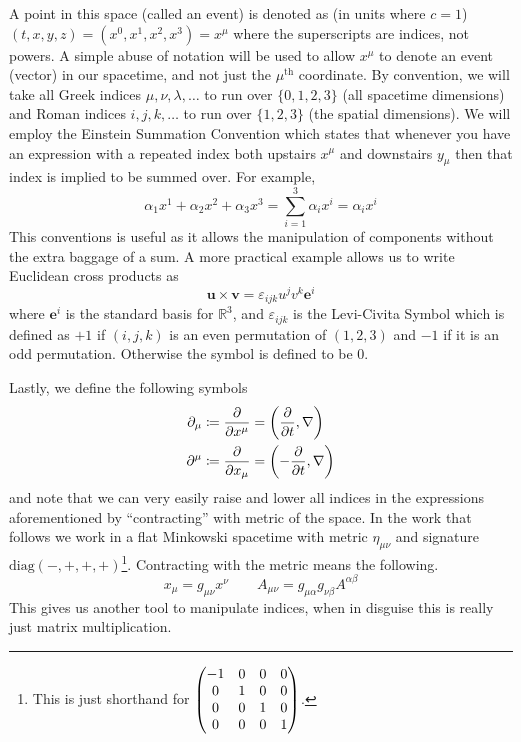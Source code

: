 A point in this space (called an event) is denoted as (in units where $c = 1$) $(t, x, y, z) = (x^0, x^1, x^2, x^3) = x^\mu$ where the superscripts are indices, not powers. A simple abuse of notation will be used to allow $x^\mu$ to denote an event (vector) in our spacetime, and not just the $\mu^\text{th}$ coordinate. By convention, we will take all Greek indices $\mu, \nu, \lambda, \ldots$ to run over $\{0,1,2,3\}$ (all spacetime dimensions) and Roman indices $i, j, k, \ldots$ to run over $\{1,2,3\}$ (the spatial dimensions). We will employ the Einstein Summation Convention which states that whenever you have an expression with a repeated index both upstairs $x^\mu$ and downstairs $y_\mu$ then that index is implied to be summed over. For example,
\begin{equation}
\alpha_1x^1 + \alpha_2x^2 + \alpha_3x^3 = \sum_{i = 1}^3\alpha_ix^i = \alpha_ix^i
\end{equation}
This conventions is useful as it allows the manipulation of components without the extra baggage of a sum. A more practical example allows us to write Euclidean cross products as
\begin{equation}
\mathbf{u}\times\mathbf{v} = \varepsilon_{ijk}u^jv^k\mathbf{e}^i
\end{equation}
where $\mathbf{e}^i$ is the standard basis for $\mathbb{R}^3$, and $\varepsilon_{ijk}$ is the Levi-Civita Symbol which is defined as $+1$ if $(i, j, k)$ is an even permutation of $(1,2,3)$ and $-1$ if it is an odd permutation. Otherwise the symbol is defined to be 0.

Lastly, we define the following symbols
\begin{align}
\label{eq:partials}
\begin{split}
\partial_\mu & \coloneqq\pdv{x^\mu} = \left(\pdv{t}, \nabla\right) \\
\partial^\mu & \coloneqq\pdv{x_\mu} = \left(-\pdv{t},\nabla\right)
\end{split}
\end{align}
and note that we can very easily raise and lower all indices in the expressions aforementioned by ``contracting'' with metric of the space. In the work that follows we work in a flat Minkowski spacetime with metric $\eta_{\mu\nu}$ and signature $\mathrm{diag}(-,+,+,+)$\footnote{This is just shorthand for $\mqty(\dmat[0]{-1,1,1,1})$.}. Contracting with the metric means the following.
\begin{equation}
x_\mu = g_{\mu\nu}x^\nu \qquad A_{\mu\nu} = g_{\mu\alpha}g_{\nu\beta}A^{\alpha\beta}
\end{equation}
This gives us another tool to manipulate indices, when in disguise this is really just matrix multiplication.
